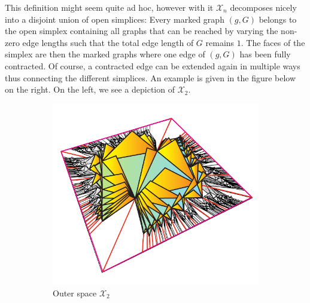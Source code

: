 This definition might seem quite ad hoc, however with it $\mathcal{X}_{n}$ decomposes nicely into
a disjoint union of open simplices: Every marked graph $(g,G)$ belongs to the open simplex
containing all graphs that can be reached by varying the non-zero edge lengths such that
the total edge length of $G$ remains $1$. The faces of the simplex are then the marked graphs where one edge of $(g,G)$
has been fully contracted. Of course, a contracted edge can be extended again in multiple ways thus connecting
the different simplices. An example is given in the figure below on the right.
On the left, we see a depiction of $\mathcal{X}_{2}$.

\begin{figure}[h]
	\centering
	\begin{subfigure}{0.3\textwidth}
		\includegraphics[width=\textwidth]{./Images/outerSpaceD2.pdf}
		\caption{Outer space $\mathcal{X}_{2}$}
	\end{subfigure}
	\hspace{0.1\textwidth}
	\begin{subfigure}{0.3\textwidth}

\end{subfigure}
\end{figure}

